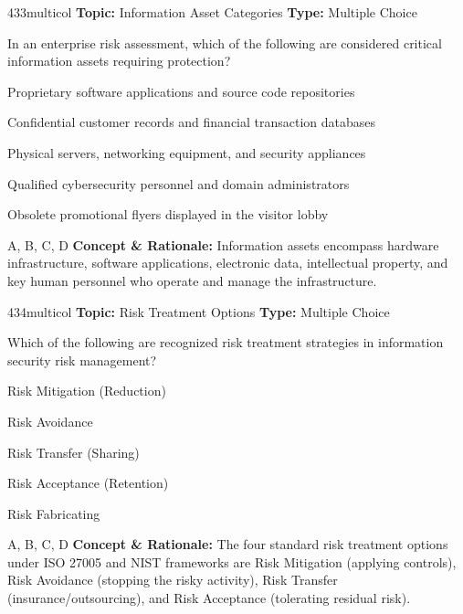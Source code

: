 \begin{qcard}{433}{multicol}
\textcolor{darkslate!75}{\small\textbf{Topic:} Information Asset Categories \hfill \textbf{Type:} Multiple Choice}\vspace{0.4em}\par
In an enterprise risk assessment, which of the following are considered critical information assets requiring protection?
\begin{qoptions}
\item Proprietary software applications and source code repositories
\item Confidential customer records and financial transaction databases
\item Physical servers, networking equipment, and security appliances
\item Qualified cybersecurity personnel and domain administrators
\item Obsolete promotional flyers displayed in the visitor lobby
\end{qoptions}
\end{qcard}
\nopagebreak
\begin{explainbox}{A, B, C, D}
\textbf{Concept \& Rationale:} Information assets encompass hardware infrastructure, software applications, electronic data, intellectual property, and key human personnel who operate and manage the infrastructure.
\end{explainbox}

\begin{qcard}{434}{multicol}
\textcolor{darkslate!75}{\small\textbf{Topic:} Risk Treatment Options \hfill \textbf{Type:} Multiple Choice}\vspace{0.4em}\par
Which of the following are recognized risk treatment strategies in information security risk management?
\begin{qoptions}
\item Risk Mitigation (Reduction)
\item Risk Avoidance
\item Risk Transfer (Sharing)
\item Risk Acceptance (Retention)
\item Risk Fabricating
\end{qoptions}
\end{qcard}
\nopagebreak
\begin{explainbox}{A, B, C, D}
\textbf{Concept \& Rationale:} The four standard risk treatment options under ISO 27005 and NIST frameworks are Risk Mitigation (applying controls), Risk Avoidance (stopping the risky activity), Risk Transfer (insurance/outsourcing), and Risk Acceptance (tolerating residual risk).
\end{explainbox}

